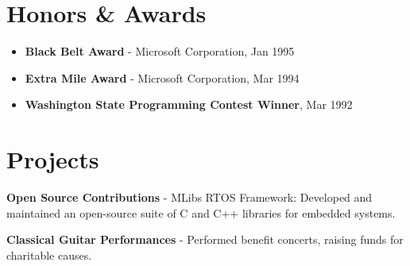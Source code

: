 \documentclass[a4paper,10pt]{article}
\begin{document}
\section*{Honors \& Awards}
\begin{itemize}[leftmargin=1cm]
    \item \textbf{Black Belt Award} - Microsoft Corporation, Jan 1995  
    \item \textbf{Extra Mile Award} - Microsoft Corporation, Mar 1994
    \item \textbf{Washington State Programming Contest Winner}, Mar 1992
\end{itemize}

\section*{Projects}
\textbf{Open Source Contributions}  
- MLibs RTOS Framework: Developed and maintained an open-source suite of C and C++ libraries for embedded systems.

\textbf{Classical Guitar Performances}  
- Performed benefit concerts, raising funds for charitable causes.
\end{document}
